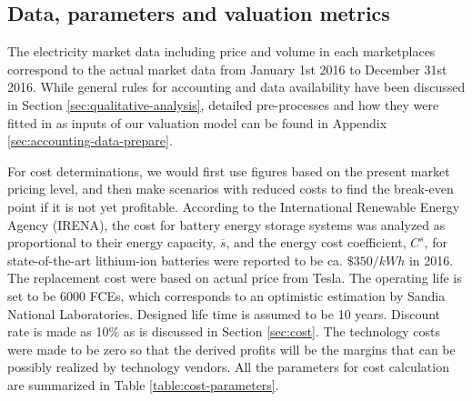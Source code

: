 \subsection{Data, parameters and valuation metrics}
The electricity market data including price and volume in each marketplaces correspond to the actual market data from January 1st 2016 to December 31st 2016. While general rules for accounting and data availability have been discussed in Section \ref{sec:qualitative-analysis}, detailed pre-processes and how they were fitted in as inputs of our valuation model can be found in Appendix \ref{sec:accounting-data-prepare}.

For cost determinations, we would first use figures based on the present market pricing level, and then make scenarios with reduced costs to find the break-even point if it is not yet profitable. According to the International Renewable Energy Agency (IRENA)\cite{IRENA2017}, the cost for battery energy storage systems was analyzed as proportional to their energy capacity, $\overline{s}$, and the energy cost coefficient, $C^s$, for state-of-the-art lithium-ion batteries were reported to be ca. $\$350/kWh$ in 2016. The replacement cost were based on actual price from Tesla\cite{Tesla1}. The operating life is set to be 6000 FCEs, which corresponds to an optimistic estimation by Sandia National Laboratories\cite{Akhil2015}. Designed life time is assumed to be 10 years. Discount rate is made as 10\% as is discussed in Section \ref{sec:cost}. The technology costs were made to be zero so that the derived profits will be the margins that can be possibly realized by technology vendors. All the parameters for cost calculation are summarized in Table \ref{table:cost-parameters}. 

